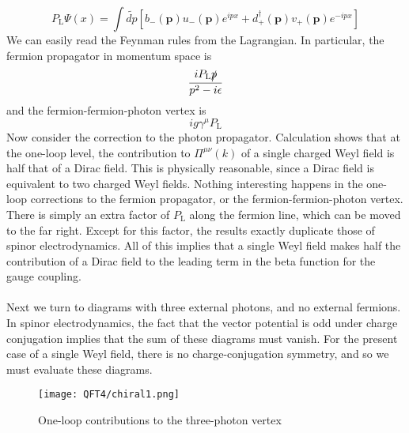 \[P_{\mathrm{L}}\Psi(x) =  \int \tilde{dp} [b_-(\bm{p})u_-(\bm{p})e^{ipx} + d_+^{\dagger}(\bm{p}) v_+(\bm{p}) e^{-ipx}]\]
We can easily read the Feynman rules from the Lagrangian. In particular, the fermion propagator in momentum space is
\[\frac{iP_{\mathrm{L}}\slashed{p}}{p^2-i\epsilon}\]
and the fermion-fermion-photon vertex is
\[ig\gamma^{\mu} P_{\mathrm{L}}\]
Now consider the correction to the photon propagator. Calculation shows that at the one-loop level, the contribution to $\Pi^{\mu\nu}(k)$ of a single charged Weyl field is half that of a Dirac field. This is physically reasonable, since a Dirac field is equivalent to two charged Weyl fields.
Nothing interesting happens in the one-loop corrections to the fermion propagator, or the fermion-fermion-photon vertex. There is simply an extra factor of $P_{\mathrm{L}}$ along the fermion line, which can be moved to the far right. Except for this factor, the results exactly duplicate those of spinor electrodynamics.
All of this implies that a single Weyl field makes half the contribution of a Dirac field to the leading term in the beta function for the gauge coupling.
\\ \\
Next we turn to diagrams with three external photons, and no external fermions. In spinor electrodynamics, the fact that the vector potential is odd under charge conjugation implies that the sum of these diagrams must vanish. For the present case of a single Weyl field, there is no charge-conjugation symmetry, and so we must evaluate these diagrams.
\begin{figure}[!h]
	\centering
	\texttt{[image: QFT4/chiral1.png]}
	\caption{One-loop contributions to the three-photon vertex}
\end{figure}

